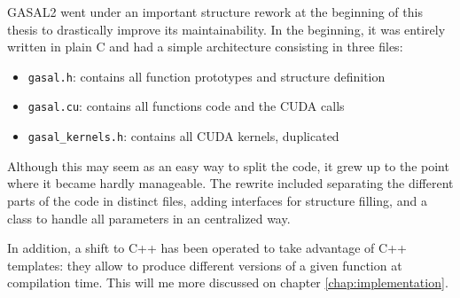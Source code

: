 GASAL2 went under an important structure rework at the beginning of this thesis to drastically improve its maintainability. In the beginning, it was entirely written in plain C and had a simple architecture consisting in three files:

\begin{itemize}
	\item \verb|gasal.h|: contains all function prototypes and structure definition
	\item \verb|gasal.cu|: contains all functions code and the CUDA calls
	\item \verb|gasal_kernels.h|: contains all CUDA kernels, duplicated
\end{itemize}

Although this may seem as an easy way to split the code, it grew up to the point where it became hardly manageable. The rewrite included separating the different parts of the code in distinct files, adding interfaces for structure filling, and a class to  handle all parameters in an centralized way.

In addition, a shift to C++ has been operated to take advantage of C++ templates: they allow to produce different versions of a given function at compilation time. This will me more discussed on chapter \ref{chap:implementation}.




